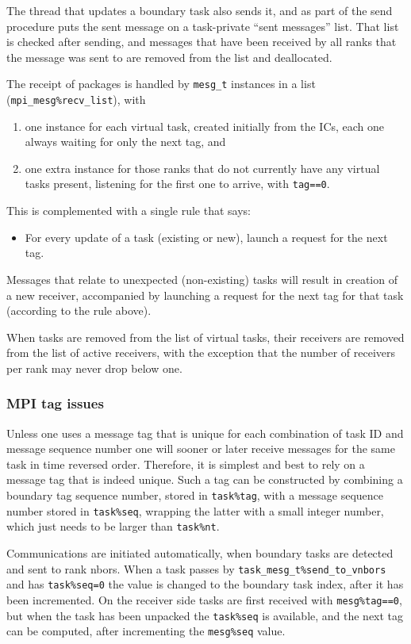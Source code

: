 \documentclass[paper=a4,fontsize=11pt]{scrartcl}
\numberwithin{equation}{section}		%
\numberwithin{figure}{section}			%
\numberwithin{table}{section}				%
\newcommand{\codecolor}{\color{Blue}}
\newcommand{\Code}[1]{{\codecolor\texttt{#1}}}
\begin{document}
The thread that updates a boundary task also sends it, and as part of the send procedure puts the sent message on a task-private ``sent messages'' list.  That list is checked after sending, and messages that have been received by all ranks that the message was sent to are removed from the list and deallocated.

The receipt of packages is handled by \Code{mesg\_t} instances in a list (\Code{mpi\_mesg\%recv\_list}), with
\begin{enumerate}
    \item one instance for each virtual task, created initially from the ICs, each one always waiting for only the next tag, and
    \item one extra instance for those ranks that do not currently have any virtual tasks present, listening for the first one to arrive, with \Code{tag==0}.
\end{enumerate}

This is complemented with a single rule that says:
\begin{itemize}
    \item For every update of a task (existing or new), launch a request for the next tag.
\end{itemize}
Messages that relate to unexpected (non-existing) tasks will result in creation of a new receiver, accompanied by launching a request for the next tag for that task (according to the rule above).

When tasks are removed from the list of virtual tasks, their receivers are removed from the list of active receivers, with the exception that the number of receivers per rank may never drop below one.

\subsubsection{MPI tag issues}
Unless one uses a message tag that is unique for each combination of task ID and message sequence number one will sooner or later receive messages for the same task in time reversed order.  Therefore, it is simplest and best to rely on a message tag that is indeed unique.  Such a tag can be constructed by combining a boundary tag sequence number, stored in \Code{task\%tag}, with a message sequence number stored in \Code{task\%seq}, wrapping the latter with a small integer number, which just needs to be larger than \Code{task\%nt}.

Communications are initiated automatically, when boundary tasks are detected and sent to rank nbors.  When a task passes by \Code{task\_mesg\_t\%send\_to\_vnbors} and has \Code{task\%seq=0} the value is changed to the boundary task index, after it has been incremented. On the receiver side tasks are first received with \Code{mesg\%tag==0}, but when the task has been unpacked the \Code{task\%seq} is available, and the next tag can be computed, after incrementing the \Code{mesg\%seq} value.
\end{document}

